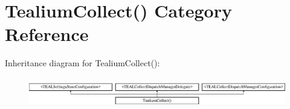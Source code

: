 \hypertarget{category_tealium_collect_07_08}{}\section{Tealium\+Collect() Category Reference}
\label{category_tealium_collect_07_08}
Inheritance diagram for Tealium\+Collect()\+:\begin{figure}[H]
\begin{center}
\leavevmode
\includegraphics[height=1.333333cm]{category_tealium_collect_07_08}
\end{center}
\end{figure}
